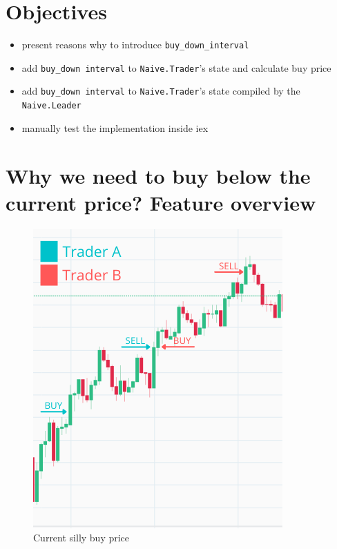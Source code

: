 \documentclass[
]{book}
\providecommand{\tightlist}{%
  \setlength{\itemsep}{0pt}\setlength{\parskip}{0pt}}
\begin{document}
\hypertarget{objectives-5}{%
\section{Objectives}\label{objectives-5}}

\begin{itemize}
\tightlist
\item
  present reasons why to introduce \texttt{buy\_down\_interval}
\item
  add \texttt{buy\_down\ interval} to \texttt{Naive.Trader}'s state and calculate buy price
\item
  add \texttt{buy\_down\ interval} to \texttt{Naive.Trader}'s state compiled by the \texttt{Naive.Leader}
\item
  manually test the implementation inside iex
\end{itemize}

\hypertarget{why-we-need-to-buy-below-the-current-price-feature-overview}{%
\section{Why we need to buy below the current price? Feature overview}\label{why-we-need-to-buy-below-the-current-price-feature-overview}}

\begin{figure}
\centering
\includegraphics{images/chapter_06_01_current_buy_price.png}
\caption{Current silly buy price}
\end{figure}
\end{document}
